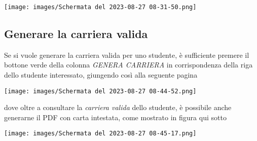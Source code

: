 \documentclass{article}
\begin{document}
    \begin{center}
        \texttt{[image: images/Schermata del 2023-08-27 08-31-50.png]}
    \end{center}

    \pagebreak

    \subsection{Generare la carriera valida}
    Se si vuole generare la carriera valida per uno studente, è sufficiente premere il bottone verde della colonna \textit{GENERA CARRIERA} in corrispondenza della riga dello studente interessato, giungendo così alla seguente pagina

    \begin{center}
        \texttt{[image: images/Schermata del 2023-08-27 08-44-52.png]}
    \end{center}

    dove oltre a consultare la \textit{carriera valida} dello studente, è possibile anche generarne il PDF con carta intestata, come mostrato in figura qui sotto

    \begin{center}
        \texttt{[image: images/Schermata del 2023-08-27 08-45-17.png]}
    \end{center}
\end{document}
